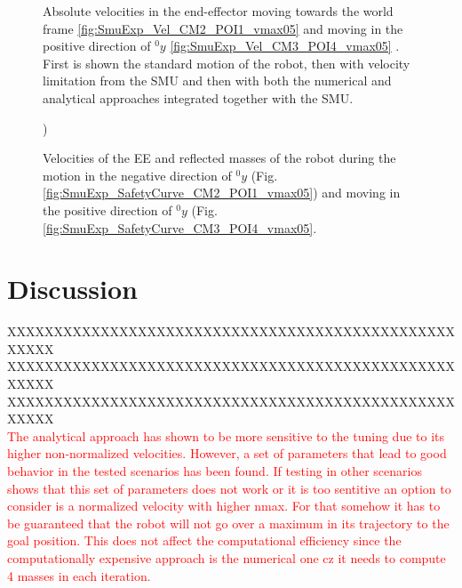 \begin{figure}[htp!]
	\centering	
	 	 	
		\caption{Absolute velocities in the end-effector moving towards the world frame \ref{fig:SmuExp_Vel_CM2_POI1_vmax05} and moving in the positive direction of ${}^{0}_{}y$ \ref{fig:SmuExp_Vel_CM3_POI4_vmax05} . First is shown the standard motion of the robot, then with velocity limitation from the SMU and then with both the numerical and analytical approaches integrated together with the SMU.}
	\label{fig:SmuExp_Vel_vmax05}
\end{figure}




\begin{figure}[htp!]
	\centering	
	 	 	
	\caption{Velocities of the EE and reflected masses of the robot during the motion in the negative direction of ${}^{0}_{}y$   (Fig.\ref{fig:SmuExp_SafetyCurve_CM2_POI1_vmax05}) and moving in the positive direction of ${}^{0}_{}y$  (Fig.\ref{fig:SmuExp_SafetyCurve_CM3_POI4_vmax05}.})
	\label{fig:SmuExp_SafetyCurve_vmax05}
\end{figure}


\section{Discussion}

XXXXXXXXXXXXXXXXXXXXXXXXXXXXXXXXXXXXXXXXXXXXXXXXXXXXX \\ 
XXXXXXXXXXXXXXXXXXXXXXXXXXXXXXXXXXXXXXXXXXXXXXXXXXXXX \\ 
XXXXXXXXXXXXXXXXXXXXXXXXXXXXXXXXXXXXXXXXXXXXXXXXXXXXX \\ 

\textcolor{red}{The analytical approach has shown to be more sensitive to the tuning due to its higher non-normalized velocities. However, a set of parameters that lead to good behavior in the tested scenarios has been found. If testing in other scenarios  shows that this set of parameters does not work or it is too sentitive an option to consider is a normalized velocity with higher nmax. For that somehow it has to be guaranteed that the robot will not go over a maximum in its trajectory to the goal position. This does not affect the computational efficiency since the computationally expensive approach is the numerical one cz it needs to compute 4 masses in each iteration. }

